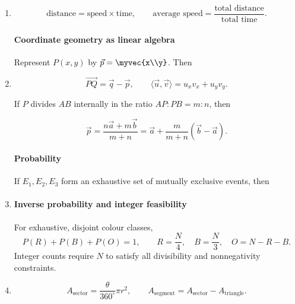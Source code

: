 \begin{enumerate}[leftmargin=0pt,itemsep=6pt]
\paragraph*{Unilateral $Z$-transform of an arithmetic progression}
For the causal sequence $x[n]=a+(n-1)d$, $n\ge1$,
\begin{align}
X(z)&=\mathcal Z_u\{x[n]\}
=\frac{az^{-1}}{1-z^{-1}}+\frac{dz^{-2}}{(1-z^{-1})^2},
\label{eq:ap-question-11}\\
S(z)&=\frac{X(z)}{1-z^{-1}}
\end{align}
is the transform of its causal accumulated sum.
\addtocounter{enumi}{1}
\item
\begin{equation}
\text{distance}=\text{speed}\times\text{time},\qquad
\text{average speed}=\frac{\text{total distance}}{\text{total time}}.
\label{eq:speed-time}
\end{equation}

\paragraph*{Coordinate geometry as linear algebra}
Represent $P(x,y)$ by $\vec p=\myvec{x\\y}$. Then

\item
\begin{equation}
\overrightarrow{PQ}=\vec q-\vec p,\qquad
\langle\vec u,\vec v\rangle=u_xv_x+u_yv_y.
\label{eq:vector-basics}
\end{equation}

If $P$ divides $AB$ internally in the ratio $AP:PB=m:n$, then

\begin{equation}
\vec p=\frac{n\vec a+m\vec b}{m+n}=\vec a+\frac{m}{m+n}(\vec b-\vec a).
\label{eq:section-vector}
\end{equation}

\paragraph*{Probability}

If $E_1,E_2,E_3$ form an exhaustive set of mutually exclusive events, then
\item
\paragraph*{Inverse probability and integer feasibility}
For exhaustive, disjoint colour classes,
\begin{equation}
P(R)+P(B)+P(O)=1,\qquad
R=\frac N4,\quad B=\frac N3,\quad O=N-R-B.
\label{eq:three-events}
\end{equation}
Integer counts require $N$ to satisfy all divisibility and nonnegativity constraints.
\item
\begin{equation}
A_{\mathrm{sector}}=\frac{\theta}{360^\circ}\pi r^2,\qquad
A_{\mathrm{segment}}=A_{\mathrm{sector}}-A_{\mathrm{triangle}}.
\label{eq:sector-segment}
\end{equation}


\end{enumerate}
